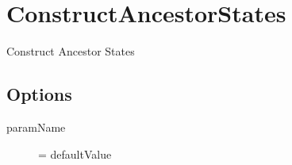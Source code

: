 \section{ConstructAncestorStates}

Construct Ancestor States

\subsection{Options}
\begin{description}
\item[paramName] = defaultValue
\end{description}
 
